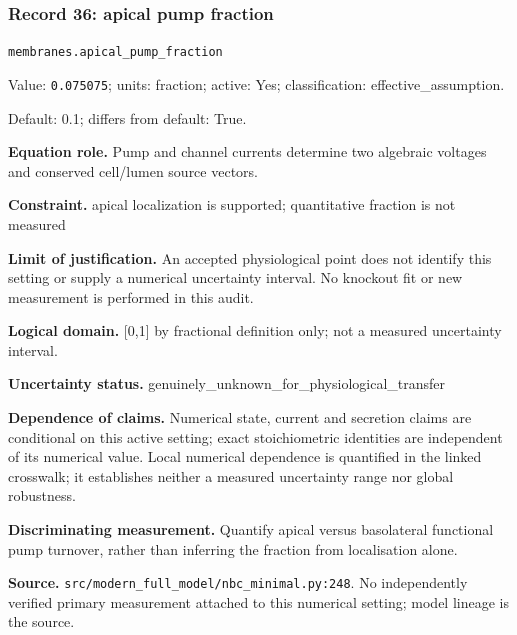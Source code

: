 \subsubsection*{Record 36: apical pump fraction}
{\small \nolinkurl{membranes.apical_pump_fraction}\par

Value: \texttt{0.075075}; units: fraction; active: Yes; classification: effective\_assumption.\par

Default: 0.1; differs from default: True.\par

\textbf{Equation role.} Pump and channel currents determine two algebraic voltages and conserved cell/lumen source vectors.\par

\textbf{Constraint.} apical localization is supported; quantitative fraction is not measured\par

\textbf{Limit of justification.} An accepted physiological point does not identify this setting or supply a numerical uncertainty interval. No knockout fit or new measurement is performed in this audit.\par

\textbf{Logical domain.} [0,1] by fractional definition only; not a measured uncertainty interval.\par

\textbf{Uncertainty status.} genuinely\_unknown\_for\_physiological\_transfer\par

\textbf{Dependence of claims.} Numerical state, current and secretion claims are conditional on this active setting; exact stoichiometric identities are independent of its numerical value. Local numerical dependence is quantified in the linked crosswalk; it establishes neither a measured uncertainty range nor global robustness.\par

\textbf{Discriminating measurement.} Quantify apical versus basolateral functional pump turnover, rather than inferring the fraction from localisation alone.\par

\textbf{Source.} \nolinkurl{src/modern_full_model/nbc_minimal.py:248}. No independently verified primary measurement attached to this numerical setting; model lineage is the source.\par}

